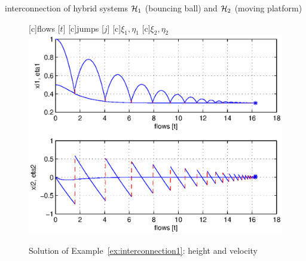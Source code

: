 \begin{example}{interconnection of hybrid systems $\mathcal{H}_1$ (bouncing ball) and $\mathcal{H}_2$ (moving platform)}
\begin{figure}[ht!]
  \begin{center}
  [c]{flows [$t$]}
  [c]{jumps [$j$]}
  [c]{$\xi_1, \eta_1$}
  [c]{$\xi_2, \eta_2$}
    {\includegraphics[width=.8\textwidth]{figures/Examples/InterconnectionH1H2.eps}}
   \caption{Solution of Example~\ref{ex:interconnection1}: height and velocity}
\label{fig:interconnection-2}
  \end{center}
\end{figure}

%


\end{example}
